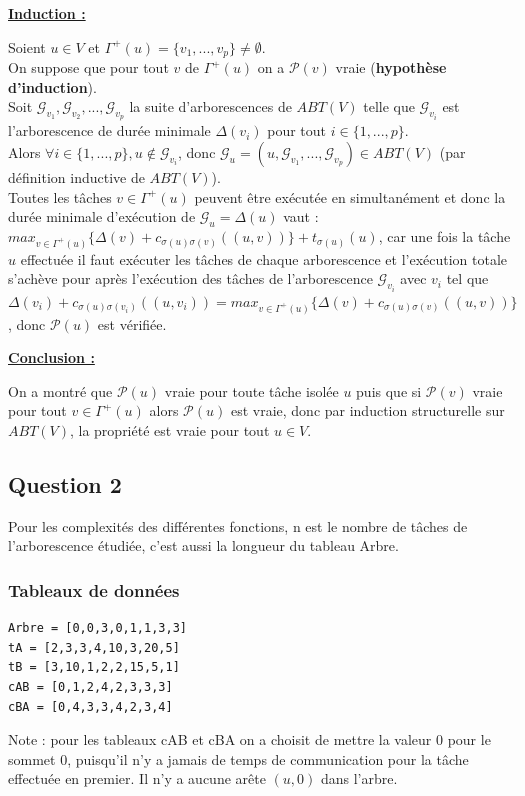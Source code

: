 \documentclass{article}
\begin{document}
\begin{flushleft}
    \bf
    \underline{Induction :}
\end{flushleft}
Soient $u \in V$ et $\Gamma^{+}(u) = \{v_{1},...,v_{p} \} \neq \emptyset$. \\
On suppose que pour tout $v$ de $\Gamma^{+}(u)$ on a $\mathcal{P}(v)$ vraie (\textbf{hypothèse d'induction}). \\
Soit $\mathcal{G}_{v_{1}},\mathcal{G}_{v_{2}},...,\mathcal{G}_{{v_p}}$ la suite d'arborescences de $ABT(V)$ telle que $\mathcal{G}_{v_i}$ est l'arborescence de durée minimale $\Delta(v_i)$ pour tout $i \in \{1,...,p\}$.\\
Alors $\forall i \in \{1,...,p\}, u \notin \mathcal{G}_{v_{i}}$, donc $\mathcal{G}_u = (u,\mathcal{G}_{v_{1}},...,\mathcal{G}_{{v_p}}) \in ABT(V)$ (par définition inductive de $ABT(V)$). \\
Toutes les tâches $v \in \Gamma^{+}(u)$ peuvent être exécutée en simultanément et donc la durée minimale d'exécution de $\mathcal{G}_u = \Delta(u)$ vaut : $max_{v \in \Gamma^{+}(u)} \{ \Delta(v) + c_{\sigma(u)\sigma(v)}((u,v))\} + t_{\sigma(u)}(u)$, car une fois la tâche $u$ effectuée il faut exécuter les tâches de chaque arborescence et l'exécution totale s'achève pour après l'exécution des tâches de l'arborescence $\mathcal{G}_{v_i}$ avec $v_i$ tel que $\Delta(v_i) + c_{\sigma(u)\sigma(v_i)}((u,v_i)) = max_{v \in \Gamma^{+}(u)} \{ \Delta(v) + c_{\sigma(u)\sigma(v)}((u,v))\}$, donc $\mathcal{P}(u)$ est vérifiée.

\begin{flushleft}
    \bf
    \underline{Conclusion :}
\end{flushleft}
On a montré que $\mathcal{P}(u)$ vraie pour toute tâche isolée $u$ puis que si $\mathcal{P}(v)$ vraie pour tout $v \in \Gamma^{+}(u)$ alors $\mathcal{P}(u)$ est vraie, donc par induction structurelle sur $ABT(V)$, la propriété est vraie pour tout $u \in V$.



\subsection{Question 2}
Pour les complexités des différentes fonctions, n est le nombre de tâches de l'arborescence étudiée, c'est aussi la longueur du tableau Arbre.
\subsubsection{Tableaux de données}
\begin{lstlisting}
Arbre = [0,0,3,0,1,1,3,3]
tA = [2,3,3,4,10,3,20,5]
tB = [3,10,1,2,2,15,5,1]
cAB = [0,1,2,4,2,3,3,3]
cBA = [0,4,3,3,4,2,3,4]
\end{lstlisting}
Note : pour les tableaux cAB et cBA on a choisit de mettre la valeur 0 pour le sommet 0, puisqu'il n'y a jamais de temps de communication pour la tâche effectuée en premier. Il n'y a aucune arête $(u,0)$ dans l'arbre.
\end{document}
